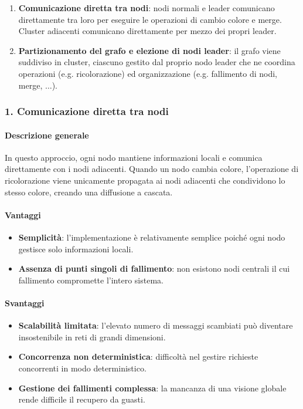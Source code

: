 \documentclass[12pt, a4paper]{report}
\begin{document}
\begin{enumerate}
    \item \textbf{Comunicazione diretta tra nodi}: nodi normali e leader comunicano direttamente tra loro per eseguire le operazioni di cambio colore e merge. Cluster adiacenti comunicano direttamente per mezzo dei propri leader.
    \item \textbf{Partizionamento del grafo e elezione di nodi leader}: il grafo viene suddiviso in cluster, ciascuno gestito dal proprio nodo leader che ne coordina operazioni (e.g. ricolorazione) ed organizzazione (e.g. fallimento di nodi, merge, $\ldots$).
\end{enumerate}

\subsubsection{1. Comunicazione diretta tra nodi}

\paragraph{Descrizione generale}
\begin{flushleft}
In questo approccio, ogni nodo mantiene informazioni locali e comunica direttamente con i nodi adiacenti. Quando un nodo cambia colore, l'operazione di ricolorazione viene unicamente propagata ai nodi adiacenti che condividono lo stesso colore, creando una diffusione a cascata.
\end{flushleft}

\paragraph{Vantaggi}

\begin{itemize}
    \item \textbf{Semplicit\`a}: l'implementazione \`e relativamente semplice poich\'e ogni nodo gestisce solo informazioni locali.
    \item \textbf{Assenza di punti singoli di fallimento}: non esistono nodi centrali il cui fallimento compromette l'intero sistema.
\end{itemize}

\paragraph{Svantaggi}

\begin{itemize}
    \item \textbf{Scalabilit\`a limitata}: l'elevato numero di messaggi scambiati pu\`o diventare insostenibile in reti di grandi dimensioni.
    \item \textbf{Concorrenza non deterministica}: difficolt\`a nel gestire richieste concorrenti in modo deterministico.
    \item \textbf{Gestione dei fallimenti complessa}: la mancanza di una visione globale rende difficile il recupero da guasti.
\end{itemize}
\end{document}
